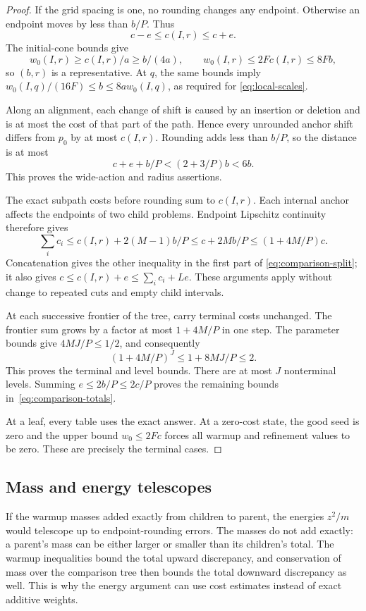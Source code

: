 \begin{proof}
If the grid spacing is one, no rounding changes any endpoint.  Otherwise an
endpoint moves by less than $b/P$.  Thus
\[
 c-e\le c(I,r)\le c+e.
\]
The initial-cone bounds give
\[
 w_0(I,r)\ge c(I,r)/a\ge b/(4a),
 \qquad
 w_0(I,r)\le2F c(I,r)\le8Fb,
\]
so $(b,r)$ is a representative.  At $q$, the same bounds imply
$w_0(I,q)/(16F)\le b\le8a w_0(I,q)$, as required for
\eqref{eq:local-scales}.

Along an alignment, each change of shift is caused by an insertion or
deletion and is at most the cost of that part of the path.  Hence every
unrounded anchor shift differs from $p_0$ by at most $c(I,r)$.  Rounding adds
less than $b/P$, so the distance is at most
\[
 c+e+b/P<(2+3/P)b<6b.
\]
This proves the wide-action and radius assertions.

The exact subpath costs before rounding sum to $c(I,r)$.  Each internal anchor
affects the endpoints of two child problems.  Endpoint Lipschitz continuity
therefore gives
\[
 \sum_i c_i\le c(I,r)+2(M-1)b/P
 \le c+2Mb/P\le(1+4M/P)c.
\]
Concatenation gives the other inequality in the first part of
\eqref{eq:comparison-split}; it also gives
$c\le c(I,r)+e\le\sum_i c_i+Le$.
These arguments apply without change to repeated cuts and empty child
intervals.

At each successive frontier of the tree, carry terminal costs unchanged.
The frontier sum grows by a factor at most $1+4M/P$ in one step.  The parameter
bounds give $4MJ/P\le1/2$, and consequently
\[
 (1+4M/P)^J\le1+8MJ/P\le2.
\]
This proves the terminal and level bounds.  There are at most $J$
nonterminal levels.  Summing $e\le2b/P\le2c/P$ proves the remaining bounds
in~\eqref{eq:comparison-totals}.

At a leaf, every table uses the exact answer.  At a zero-cost state, the
good seed is zero and the upper bound $w_0\le2Fc$ forces all warmup and
refinement values to be zero.  These are precisely the terminal cases.
\end{proof}

\subsection{Mass and energy telescopes}

If the warmup masses added exactly from children to parent, the energies
$z^2/m$ would telescope up to endpoint-rounding errors.  The masses do not
add exactly: a parent's mass can be either
larger or smaller than its children's total.  The warmup inequalities bound
the total upward discrepancy, and conservation of mass over the comparison
tree then bounds the total downward discrepancy as well.  This is why the
energy argument can use cost estimates instead of exact additive weights.

